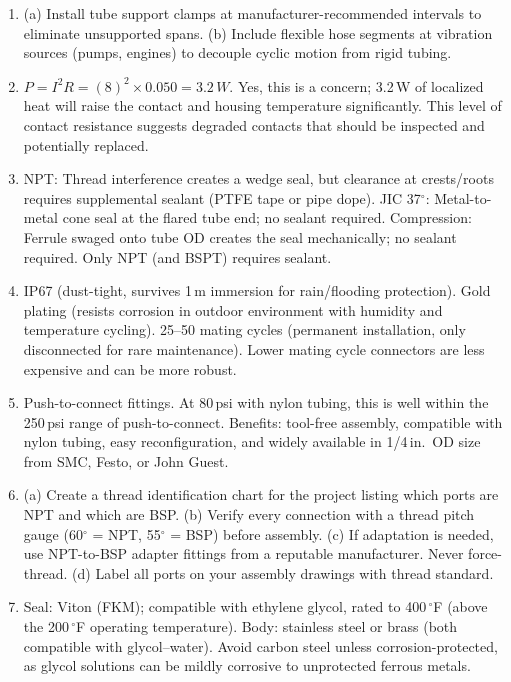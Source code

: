 \documentclass[11pt,letterpaper,twoside,openany]{book}
\providecommand{\ang}[1]{#1\ensuremath{{}^{\circ}}}
\begin{document}
\begin{enumerate}[leftmargin=1.5em]
  \item (a) Install tube support clamps at manufacturer-recommended intervals to eliminate unsupported spans. (b) Include flexible hose segments at vibration sources (pumps, engines) to decouple cyclic motion from rigid tubing.

  \item $P = I^2R = (8)^2 \times 0.050 = 3.2\,W$. Yes, this is a concern; 3.2\,W of localized heat will raise the contact and housing temperature significantly. This level of contact resistance suggests degraded contacts that should be inspected and potentially replaced.

  \item NPT: Thread interference creates a wedge seal, but clearance at crests/roots requires supplemental sealant (PTFE tape or pipe dope). JIC 37$^{\circ}$: Metal-to-metal cone seal at the flared tube end; no sealant required. Compression: Ferrule swaged onto tube OD creates the seal mechanically; no sealant required. Only NPT (and BSPT) requires sealant.

  \item IP67 (dust-tight, survives 1\,m immersion for rain/flooding protection). Gold plating (resists corrosion in outdoor environment with humidity and temperature cycling). 25--50 mating cycles (permanent installation, only disconnected for rare maintenance). Lower mating cycle connectors are less expensive and can be more robust.

  \item Push-to-connect fittings. At 80\,psi with nylon tubing, this is well within the 250\,psi range of push-to-connect. Benefits: tool-free assembly, compatible with nylon tubing, easy reconfiguration, and widely available in 1/4\,in.\ OD size from SMC, Festo, or John Guest.

  \item (a) Create a thread identification chart for the project listing which ports are NPT and which are BSP. (b) Verify every connection with a thread pitch gauge (\ang{60} = NPT, \ang{55} = BSP) before assembly. (c) If adaptation is needed, use NPT-to-BSP adapter fittings from a reputable manufacturer. Never force-thread. (d) Label all ports on your assembly drawings with thread standard.

  \item Seal: Viton (FKM); compatible with ethylene glycol, rated to 400\,$^{\circ}$F (above the 200\,$^{\circ}$F operating temperature). Body: stainless steel or brass (both compatible with glycol--water). Avoid carbon steel unless corrosion-protected, as glycol solutions can be mildly corrosive to unprotected ferrous metals.


\end{enumerate}
\end{document}
